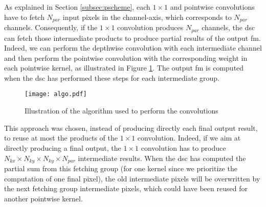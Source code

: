 As explained in Section \ref{subsec:pscheme}, each $1 \times 1$ and pointwise convolutions have to fetch $N_{par}$ input pixels in the channel-axis, which corresponds to $N_{par}$ channels. Consequently, if the $1 \times 1$ convolution produces $N_{par}$ channels, the \acrshort{dsc} can fetch those intermediate products to produce partial results of the output \acrshort{fm}. Indeed, we can perform the depthwise convolution with each intermediate channel and then perform the pointwise convolution with the corresponding weight in each pointwise kernel, as illustrated in Figure \ref{fig:algo}. The output \acrshort{fm} is computed when the \acrshort{dsc} has performed these steps for each intermediate group.
%
\begin{figure}[H]
    \centering
    \texttt{[image: algo.pdf]}
    \caption{Illustration of the algorithm used to perform the convolutions}
    \label{fig:algo}
\end{figure}

This approach was chosen, instead of producing directly each final output result, to reuse at most the products of the $1 \times 1$ convolution. Indeed, if we aim at directly producing a final output, the $1 \times 1$ convolution has to produce $N_{kx} \times N_{ky} \times N_{ky} \times N_{par}$ intermediate results. When the \acrshort{dsc} has computed the partial sum from this fetching group (for one kernel since we prioritize the computation of one final pixel), the old intermediate pixels will be overwritten by the next fetching group intermediate pixels, which could have been reused for another pointwise kernel.

